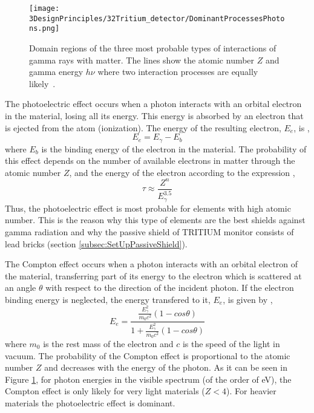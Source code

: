 \begin{figure}[h]
\centering
\texttt{[image: 3DesignPrinciples/32Tritium\_detector/DominantProcessesPhotons.png]}
\caption{Domain regions of the three most probable types of interactions of gamma rays with matter. The lines show the atomic number $Z$ and gamma energy $h\nu$ where two interaction processes are equally likely\label{fig:ProcessesPhotons}~\cite{Knoll}.}
\end{figure}

The photoelectric effect occurs when a photon interacts with an orbital electron in the material, losing all its energy. This energy is absorbed by an electron that is ejected from the atom (ionization). The energy of the resulting electron, $E_e$, is \cite{Knoll, Leo},
\begin{equation}
E_e = E_\gamma - E_b 
\label{eq:PhotoelectricEffect}
\end{equation}
where $E_b$ is the binding energy of the electron in the material. The probability of this effect depends on the number of available electrons in matter through the atomic number $Z$, and the energy of the electron according to the expression \cite{Knoll},
\begin{equation}
\tau \approx \frac{Z^n}{E_\gamma^{3.5}}
\label{eq:PhotoelectricProb}
\end{equation}
Thus, the photoelectric effect is most probable for elements with high atomic number. This is the reason why this type of elements are the best shields against gamma radiation and why the passive shield of TRITIUM monitor consists of lead bricks (section \ref{subsec:SetUpPassiveShield}). %

The Compton effect occurs when a photon interacts with an orbital electron of the material, transferring part of its energy to the electron which is scattered at an angle $\theta$ with respect to the direction of the incident photon. If the electron binding energy is neglected, the energy transfered to it, $E_e$, is given by \cite{Knoll, Leo},
\begin{equation}
E_e=\frac{\displaystyle{\frac{E_\gamma^2}{m_0c^2}}\left(1-cos\theta\right)}{1+ \displaystyle{\frac{E_\gamma^2}{m_0c^2}}\left(1-cos\theta\right)}
\label{eq:ComptonEffect}
\end{equation}
where $m_0$ is the rest mass of the electron and $c$ is the speed of the light in vacuum. The probability of the Compton effect is proportional to the atomic number $Z$  and decreases with the energy of the photon. As it can be seen in Figure \ref{fig:ProcessesPhotons}, for photon energies in the visible spectrum (of the order of eV), the Compton effect is only likely for very light materials ($Z<4$). For heavier materials the photoelectric effect is dominant.

